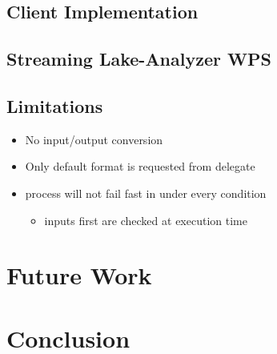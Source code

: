 	\subsection{Client Implementation}
	\subsection{Streaming Lake-Analyzer WPS}
	\subsection{Limitations}
	\begin{itemize}
		\item No input/output conversion
		\item Only default format is requested from delegate
		\item process will not fail fast in under every condition
		\begin{itemize}
			\item inputs first are checked at execution time
		\end{itemize}
	\end{itemize}
\section{Future Work}
\section{Conclusion}